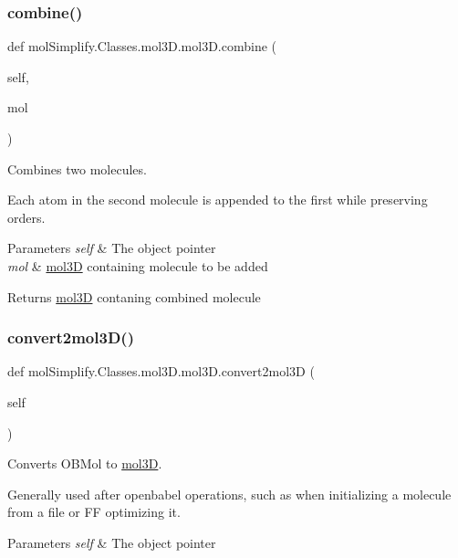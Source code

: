 \subsubsection{\texorpdfstring{combine()}{combine()}}
{\footnotesize\ttfamily def mol\+Simplify.\+Classes.\+mol3\+D.\+mol3\+D.\+combine (\begin{DoxyParamCaption}\item[{}]{self,  }\item[{}]{mol }\end{DoxyParamCaption})}



Combines two molecules. 

Each atom in the second molecule is appended to the first while preserving orders. 
\begin{DoxyParams}{Parameters}
{\em self} & The object pointer \\
\hline
{\em mol} & \hyperlink{classmolSimplify_1_1Classes_1_1mol3D_1_1mol3D}{mol3D} containing molecule to be added \\
\hline
\end{DoxyParams}
\begin{DoxyReturn}{Returns}
\hyperlink{classmolSimplify_1_1Classes_1_1mol3D_1_1mol3D}{mol3D} contaning combined molecule 
\end{DoxyReturn}
\mbox{\label{classmolSimplify_1_1Classes_1_1mol3D_1_1mol3D_a10ce42207cd8291c685640438f8de1a8}} 
\subsubsection{\texorpdfstring{convert2mol3\+D()}{convert2mol3D()}}
{\footnotesize\ttfamily def mol\+Simplify.\+Classes.\+mol3\+D.\+mol3\+D.\+convert2mol3D (\begin{DoxyParamCaption}\item[{}]{self }\end{DoxyParamCaption})}



Converts O\+B\+Mol to \hyperlink{classmolSimplify_1_1Classes_1_1mol3D_1_1mol3D}{mol3D}. 

Generally used after openbabel operations, such as when initializing a molecule from a file or FF optimizing it. 
\begin{DoxyParams}{Parameters}
{\em self} & The object pointer \\
\hline
\end{DoxyParams}
\mbox{\label{classmolSimplify_1_1Classes_1_1mol3D_1_1mol3D_acc86e8896c87c6287cfe504321ec8b11}} 
